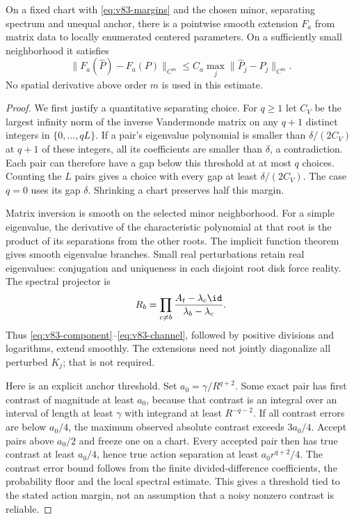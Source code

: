 \begin{lemma}\label{lem:v83-local}
On a fixed chart with \eqref{eq:v83-margins} and the chosen minor,
separating spectrum and unequal anchor, there is a pointwise smooth
extension $F_a$ from matrix data to locally enumerated centered
parameters. On a sufficiently small neighborhood it satisfies
\begin{equation}\label{eq:v83-local-estimate}
 \|F_a(\widehat P)-F_a(P)\|_{C^m}
       \le C_a\max_j\|\widehat P_j-P_j\|_{C^m}.
\end{equation}
No spatial derivative above order $m$ is used in this estimate.
\end{lemma}
\begin{proof}
We first justify a quantitative separating choice. For $q\ge1$ let
$C_V$ be the largest infinity norm of the inverse Vandermonde matrix
on any $q+1$ distinct integers in $\{0,\ldots,qL\}$. If a pair's
eigenvalue polynomial is smaller than $\delta/(2C_V)$ at $q+1$
of these integers, all its coefficients are smaller than $\delta$,
a contradiction. Each pair can therefore have a gap below this
threshold at at most $q$ choices. Counting the $L$ pairs gives a
choice with every gap at least $\delta/(2C_V)$. The case $q=0$
uses its gap $\delta$. Shrinking a chart preserves half this margin.

Matrix inversion is smooth on the selected minor neighborhood. For a
simple eigenvalue, the derivative of the characteristic polynomial at
that root is the product of its separations from the other roots.
The implicit function theorem gives smooth eigenvalue branches. Small
real perturbations retain real eigenvalues: conjugation and uniqueness
in each disjoint root disk force reality. The spectral projector is
\[
 R_b=\prod_{c\ne b}\frac{A_t-\lambda_c\id}{\lambda_b-\lambda_c}.
\]
Thus \eqref{eq:v83-component}--\eqref{eq:v83-channel}, followed by
positive divisions and logarithms, extend smoothly. The extensions
need not jointly diagonalize all perturbed $K_j$; that is not required.

Here is an explicit anchor threshold. Set $a_0=\gamma/R^{q+2}$.
Some exact pair has first contrast of magnitude at least $a_0$,
because that contrast is an integral over an interval of length at
least $\gamma$ with integrand at least $R^{-q-2}$. If all contrast
errors are below $a_0/4$, the maximum observed absolute contrast
exceeds $3a_0/4$. Accept pairs above $a_0/2$ and freeze one on a
chart. Every accepted pair then has true contrast at least $a_0/4$,
hence true action separation at least $a_0r^{q+2}/4$.
The contrast error bound follows from the finite divided-difference
coefficients, the probability floor and the local spectral estimate.
This gives a threshold tied to the stated action margin, not an
assumption that a noisy nonzero contrast is reliable.


\end{proof}
